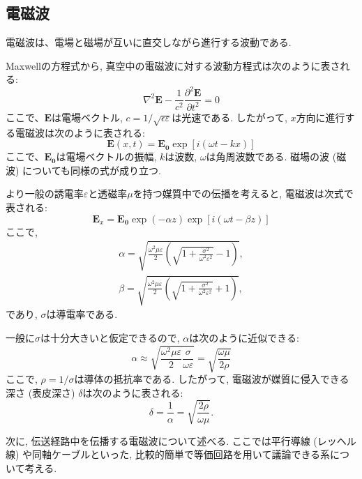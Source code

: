 \documentclass[uplatex,dvipdfmx,a4j,12pt]{jsarticle}
\begin{document}
\subsection{電磁波}
電磁波は、電場と磁場が互いに直交しながら進行する波動である.

Maxwellの方程式から, 真空中の電磁波に対する波動方程式は次のように表される:
\begin{equation}
    \nabla^2 \mathbf{E} - \frac{1}{c^2} \frac{\partial^2 \mathbf{E}}{\partial t^2} = 0
\end{equation}
ここで、$\mathbf{E}$は電場ベクトル, $c = 1/\sqrt{\epsilon\varepsilon}$は光速である.
したがって, $x$方向に進行する電磁波は次のように表される:
\begin{equation}
    \mathbf{E}(x,t) = \mathbf{E_0} \exp{[i(\omega t - kx)]}
\end{equation}
ここで、$\mathbf{E_0}$は電場ベクトルの振幅, $k$は波数, $\omega$は角周波数である.
磁場の波 (磁波) についても同様の式が成り立つ.

より一般の誘電率$\varepsilon$と透磁率$\mu$を持つ媒質中での伝播を考えると, 電磁波は次式で表される:
\begin{equation}
  \mathbf{E}_x = \mathbf{E_0}\exp{(-\alpha z)} \exp{[i(\omega t - \beta z)]}
\end{equation}
ここで, 
\begin{gather}
  \alpha = \sqrt{\frac{\omega^2 \mu \varepsilon}{2} \left(\sqrt{1 + \frac{\sigma^2}{\omega^2 \varepsilon^2}} - 1\right)}, \\
  \beta = \sqrt{\frac{\omega^2 \mu \varepsilon}{2} \left(\sqrt{1 + \frac{\sigma^2}{\omega^2 \varepsilon^2}} + 1\right)},
\end{gather}
であり, $\sigma$は導電率である.

一般に$\sigma$は十分大きいと仮定できるので, $\alpha$は次のように近似できる:
\begin{equation}
  \alpha \approx \sqrt{\frac{\omega^2 \mu \varepsilon}{2} \frac{\sigma}{\omega \varepsilon}} = \sqrt{\frac{\omega \mu}{2 \rho}}
\end{equation}
ここで, $\rho = 1 / \sigma$は導体の抵抗率である.
したがって, 電磁波が媒質に侵入できる深さ (表皮深さ) $\delta$は次のように表される:
\begin{equation}
  \delta = \frac{1}{\alpha} = \sqrt{\frac{2 \rho}{\omega \mu}}.
  \label{eq:skin_depth}
\end{equation}

\enskip

次に, 伝送経路中を伝播する電磁波について述べる.
ここでは平行導線 (レッヘル線) や同軸ケーブルといった, 比較的簡単で等価回路を用いて議論できる系について考える.
\end{document}
